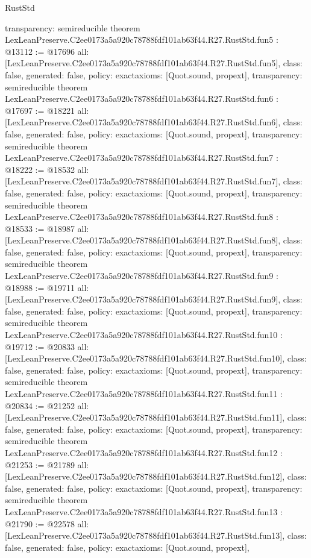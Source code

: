 \begin{lexlean}{RustStd}
\begin{coremodule}
{  transparency: semireducible
}
theorem LexLeanPreserve.C2ee0173a5a920c78788fdf101ab63f44.R27.RustStd.fun5 : @13112 := @17696 {
  all: [LexLeanPreserve.C2ee0173a5a920c78788fdf101ab63f44.R27.RustStd.fun5],
  class: false,
  generated: false,
  policy: exact{axioms: [Quot.sound, propext]},
  transparency: semireducible
}
theorem LexLeanPreserve.C2ee0173a5a920c78788fdf101ab63f44.R27.RustStd.fun6 : @17697 := @18221 {
  all: [LexLeanPreserve.C2ee0173a5a920c78788fdf101ab63f44.R27.RustStd.fun6],
  class: false,
  generated: false,
  policy: exact{axioms: [Quot.sound, propext]},
  transparency: semireducible
}
theorem LexLeanPreserve.C2ee0173a5a920c78788fdf101ab63f44.R27.RustStd.fun7 : @18222 := @18532 {
  all: [LexLeanPreserve.C2ee0173a5a920c78788fdf101ab63f44.R27.RustStd.fun7],
  class: false,
  generated: false,
  policy: exact{axioms: [Quot.sound, propext]},
  transparency: semireducible
}
theorem LexLeanPreserve.C2ee0173a5a920c78788fdf101ab63f44.R27.RustStd.fun8 : @18533 := @18987 {
  all: [LexLeanPreserve.C2ee0173a5a920c78788fdf101ab63f44.R27.RustStd.fun8],
  class: false,
  generated: false,
  policy: exact{axioms: [Quot.sound, propext]},
  transparency: semireducible
}
theorem LexLeanPreserve.C2ee0173a5a920c78788fdf101ab63f44.R27.RustStd.fun9 : @18988 := @19711 {
  all: [LexLeanPreserve.C2ee0173a5a920c78788fdf101ab63f44.R27.RustStd.fun9],
  class: false,
  generated: false,
  policy: exact{axioms: [Quot.sound, propext]},
  transparency: semireducible
}
theorem LexLeanPreserve.C2ee0173a5a920c78788fdf101ab63f44.R27.RustStd.fun10 : @19712 := @20833 {
  all: [LexLeanPreserve.C2ee0173a5a920c78788fdf101ab63f44.R27.RustStd.fun10],
  class: false,
  generated: false,
  policy: exact{axioms: [Quot.sound, propext]},
  transparency: semireducible
}
theorem LexLeanPreserve.C2ee0173a5a920c78788fdf101ab63f44.R27.RustStd.fun11 : @20834 := @21252 {
  all: [LexLeanPreserve.C2ee0173a5a920c78788fdf101ab63f44.R27.RustStd.fun11],
  class: false,
  generated: false,
  policy: exact{axioms: [Quot.sound, propext]},
  transparency: semireducible
}
theorem LexLeanPreserve.C2ee0173a5a920c78788fdf101ab63f44.R27.RustStd.fun12 : @21253 := @21789 {
  all: [LexLeanPreserve.C2ee0173a5a920c78788fdf101ab63f44.R27.RustStd.fun12],
  class: false,
  generated: false,
  policy: exact{axioms: [Quot.sound, propext]},
  transparency: semireducible
}
theorem LexLeanPreserve.C2ee0173a5a920c78788fdf101ab63f44.R27.RustStd.fun13 : @21790 := @22578 {
  all: [LexLeanPreserve.C2ee0173a5a920c78788fdf101ab63f44.R27.RustStd.fun13],
  class: false,
  generated: false,
  policy: exact{axioms: [Quot.sound, propext]},
}
\end{coremodule}
\end{lexlean}
